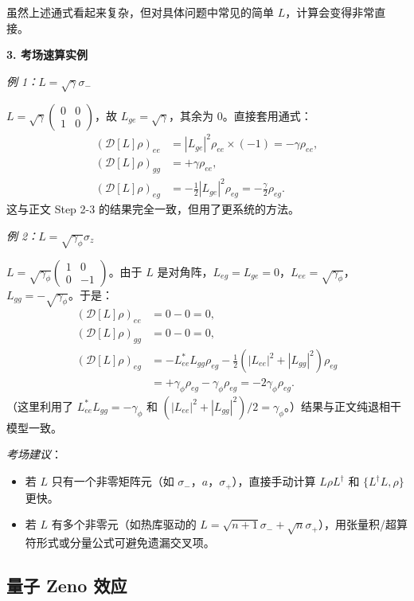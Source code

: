 虽然上述通式看起来复杂，但对具体问题中常见的简单 $L$，计算会变得非常直接。

\textbf{3. 考场速算实例}

\textit{例 1：$L=\sqrt{\gamma}\sigma_-$}

$L = \sqrt{\gamma}\begin{pmatrix} 0 & 0 \\ 1 & 0 \end{pmatrix}$，故 $L_{ge}=\sqrt{\gamma}$，其余为 0。直接套用通式：
\begin{align*}
(\mathcal{D}[L]\rho)_{ee} &= |L_{ge}|^2 \rho_{ee} \times (-1) = -\gamma\rho_{ee}, \\
(\mathcal{D}[L]\rho)_{gg} &= +\gamma\rho_{ee}, \\
(\mathcal{D}[L]\rho)_{eg} &= -\frac{1}{2}|L_{ge}|^2 \rho_{eg} = -\frac{\gamma}{2}\rho_{eg}.
\end{align*}
这与正文 Step 2-3 的结果完全一致，但用了更系统的方法。

\textit{例 2：$L=\sqrt{\gamma_\phi}\sigma_z$}

$L = \sqrt{\gamma_\phi}\begin{pmatrix} 1 & 0 \\ 0 & -1 \end{pmatrix}$。由于 $L$ 是对角阵，$L_{eg}=L_{ge}=0$，$L_{ee}=\sqrt{\gamma_\phi}$，$L_{gg}=-\sqrt{\gamma_\phi}$。于是：
\begin{align*}
(\mathcal{D}[L]\rho)_{ee} &= 0 - 0 = 0, \\
(\mathcal{D}[L]\rho)_{gg} &= 0 - 0 = 0, \\
(\mathcal{D}[L]\rho)_{eg} &= -L_{ee}^* L_{gg} \rho_{eg} - \frac{1}{2}(|L_{ee}|^2+|L_{gg}|^2)\rho_{eg} \\
&= +\gamma_\phi\rho_{eg} - \gamma_\phi\rho_{eg} = -2\gamma_\phi\rho_{eg}.
\end{align*}
（这里利用了 $L_{ee}^*L_{gg} = -\gamma_\phi$ 和 $(|L_{ee}|^2+|L_{gg}|^2)/2 = \gamma_\phi$。）结果与正文纯退相干模型一致。

\textit{考场建议}：
\begin{itemize}[nosep]
    \item 若 $L$ 只有一个非零矩阵元（如 $\sigma_-$，$a$，$\sigma_+$），直接手动计算 $L\rho L^\dagger$ 和 $\{L^\dagger L, \rho\}$ 更快。
    \item 若 $L$ 有多个非零元（如热库驱动的 $L=\sqrt{n+1}\sigma_- + \sqrt{n}\sigma_+$），用张量积/超算符形式或分量公式可避免遗漏交叉项。
\end{itemize}

\subsection{量子 Zeno 效应}

